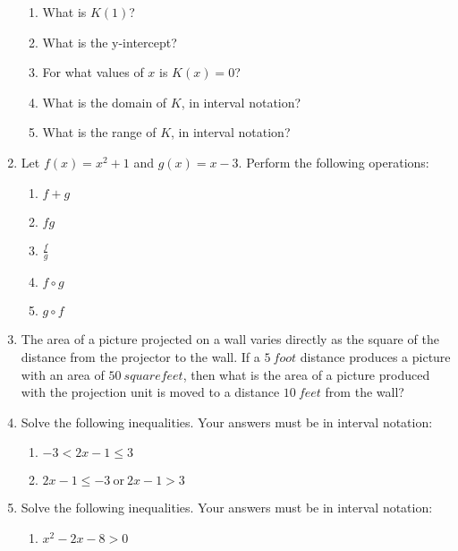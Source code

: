\documentclass[letterpaper,12pt,fleqn]{article}
\begin{document}
\begin{enumerate}
  \begin{enumerate}
  \item What is $K(1)$?

  \item What is the y-intercept?

  \item For what values of $x$ is $K(x)=0$?

  \item What is the domain of $K$, in interval notation?

  \item What is the range of $K$, in interval notation?
  \end{enumerate}

\item Let $f(x)=x^2+1$ and $g(x)=x-3$. Perform the
  following operations:
  \begin{enumerate}
  \item $f+g$

  \item $fg$
    
  \item $\frac{f}{g}$
    
  \item $f\circ g$
    
  \item $g\circ f$

  \end{enumerate}

\item The area of a picture projected on a wall varies directly as the
  square of the distance from the projector to the wall. If a $\SI{5}{foot}$
  distance produces a picture with an area of $\SI{50}{square feet}$, then what
  is the area of a picture produced with the projection unit is moved to a
  distance $\SI{10}{feet}$ from the wall?

\item Solve the following inequalities. Your answers must be in interval
  notation:
  \begin{enumerate}
  \item $-3<2x-1\le3$

  \item $2x-1\le-3\ \mbox{or}\ 2x-1>3$

  \end{enumerate}

\item Solve the following inequalities. Your answers must be in interval
  notation:
  \begin{enumerate}
  \item $x^2-2x-8>0$


\end{enumerate}
\end{enumerate}
\end{document}
